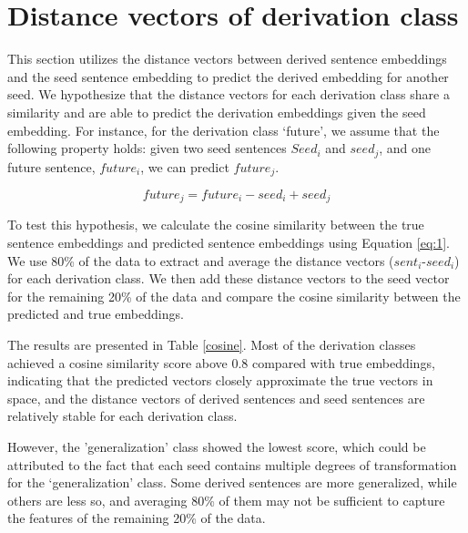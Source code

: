 \documentclass[11pt]{article}
\begin{document}
\section{Distance vectors of derivation class}

This section utilizes the distance vectors between derived sentence embeddings and the seed sentence embedding to predict the derived embedding for another seed. We hypothesize that the distance vectors for each derivation class share a similarity and are able to predict the derivation embeddings given the seed embedding. For instance, for the derivation class `future', we assume that the following property holds: given two seed sentences  $Seed_i$ and $seed_j$, and one future sentence, $future_i$, we can predict $future_j$.
 
\begin{equation}
\label{eq:1}
 future_j = future_i - seed_i + seed_j
\end{equation}

To test this hypothesis, we calculate the cosine similarity between the true sentence embeddings and predicted sentence embeddings using Equation \ref{eq:1}. We use 80\% of the data to extract and average the distance vectors ($sent_i$-$seed_i$) for each derivation class. We then add these distance vectors to the seed vector for the remaining 20\% of the data and compare the cosine similarity between the predicted and true embeddings.

The results are presented in Table \ref{cosine}. Most of the derivation classes achieved a cosine similarity score above 0.8 compared with true embeddings, indicating that the predicted vectors closely approximate the true vectors in space, and the distance vectors of derived sentences and seed sentences are relatively stable for each derivation class.

However, the 'generalization' class showed the lowest score, which could be attributed to the fact that each seed contains multiple degrees of transformation for the `generalization' class. Some derived sentences are more generalized, while others are less so, and averaging 80\% of them may not be sufficient to capture the features of the remaining 20\% of the data.
\end{document}
